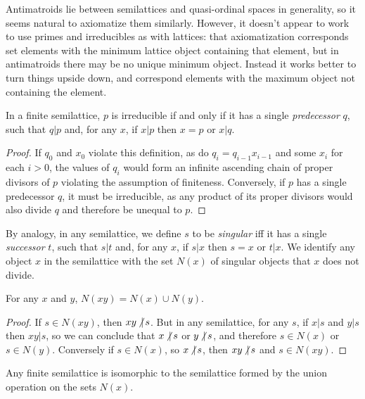 \documentclass[11pt]{llncs}
\begin{document}
{Antimatroids lie between semilattices and quasi-ordinal spaces in generality, so it seems natural to axiomatize them similarly. However, it doesn't appear to work to use primes and irreducibles as with lattices: that axiomatization corresponds set elements with the minimum lattice object containing that element, but in antimatroids there may be no unique minimum object. Instead it works better to turn things upside down, and correspond elements with the maximum object not containing the element.

\begin{lemma}
In a finite semilattice, $p$ is irreducible if and only if it has a single \emph{predecessor} $q$, such that $q|p$ and, for any $x$, if $x|p$ then $x=p$ or $x|q$.
\end{lemma}

\begin{proof}
If $q_0$ and $x_0$ violate this definition, as do $q_i=q_{i-1}x_{i-1}$ and some $x_i$ for each $i>0$, the values of $q_i$ would form an infinite ascending chain of proper divisors of $p$ violating the assumption of finiteness. Conversely, if $p$ has a single predecessor $q$, it must be irreducible, as any product of its proper divisors would also divide $q$ and therefore be unequal to $p$.
\end{proof}

By analogy, in any semilattice, we define $s$ to be \emph{singular} iff it has a single \emph{successor} $t$, such that $s|t$ and, for any $x$, if $s|x$ then $s=x$ or $t|x$. We identify any object $x$ in the semilattice with the set $N(x)$ of singular objects that $x$ does not divide.

\begin{lemma}
For any $x$ and $y$, $N(xy)=N(x)\cup N(y)$.
\end{lemma}

\begin{proof}
If $s\in N(xy)$, then $xy\mathop{\not|} s$. But in any semilattice, for any $s$, if $x|s$ and $y|s$ then $xy|s$, so we can conclude that $x\mathop{\not|} s$ or $y\mathop{\not|} s$, and therefore $s\in N(x)$ or $s\in N(y)$.
Conversely if $s\in N(x)$, so $x\mathop{\not|} s$, then $xy\mathop{\not|} s$ and $s\in N(xy)$.
\end{proof}

\begin{theorem}
\label{thm:Nsemilat}
Any finite semilattice is isomorphic to the semilattice formed by the union operation on the sets $N(x)$.
\end{theorem}

}
\end{document}
